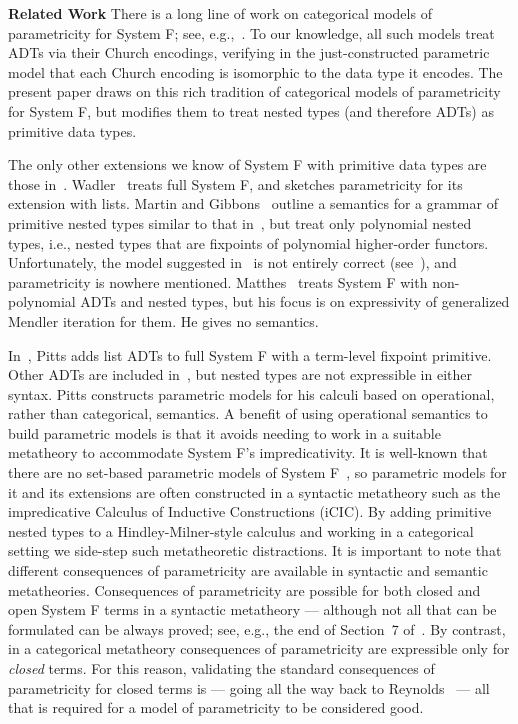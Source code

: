 \documentclass[runningheads]{llncs}
\begin{document}
\vspace*{0.05in}

\noindent
{\bf Related Work}\/ There is a long line of work on categorical
models of parametricity for System F; see,
e.g.,~\cite{bfss90,bm05,dr04,gjfor15,has94,jac99,mr92,rr94}.  To our
knowledge, all such models treat ADTs via their Church encodings,
verifying in the just-constructed parametric model that each Church
encoding is isomorphic to the data type it encodes.  The present paper
draws on this rich tradition of categorical models of parametricity
for System F, but modifies them to treat nested types (and therefore
ADTs) as primitive data types.

The only other extensions we know of System F with primitive data
types are those in~\cite{mat11,mg01,pit98,pit00,wad89}.
Wadler~\cite{wad89} treats full System F, and sketches parametricity
for its extension with lists. Martin and Gibbons~\cite{mg01} outline a
semantics for a grammar of primitive nested types similar to that
in~\cite{jp19}, but treat only polynomial nested types, i.e., nested
types that are fixpoints of polynomial higher-order
functors. Unfortunately, the model suggested in~\cite{mg01} is not
entirely correct (see~\cite{jp19}), and parametricity is nowhere
mentioned.  Matthes~\cite{mat11} treats System F with non-polynomial
ADTs and nested types, but his focus is on expressivity of generalized
Mendler iteration for them. He gives no semantics.

In~\cite{pit00}, Pitts adds list ADTs to full System F with a
term-level fixpoint primitive. Other ADTs are included
in~\cite{pit98}, but nested types are not expressible in either
syntax. Pitts constructs parametric models for his calculi based on
operational, rather than categorical, semantics. A benefit of using
operational semantics to build parametric models is that it avoids
needing to work in a suitable metatheory to accommodate System F's
impredicativity. It is well-known that there are no set-based
parametric models of System F~\cite{rey84}, so parametric models for
it and its extensions are often constructed in a syntactic metatheory
such as the impredicative Calculus of Inductive Constructions (iCIC).
By adding primitive nested types to a Hindley-Milner-style calculus
and working in a categorical setting we side-step such metatheoretic
distractions. It is important to note that different consequences of
parametricity are available in syntactic and semantic
metatheories. Consequences of parametricity are possible for both
closed and open System F terms in a syntactic metatheory --- although
not all that can be formulated can be always proved; see, e.g., the
end of Section~7 of~\cite{bm98}. By contrast, in a categorical
metatheory consequences of parametricity are expressible only for {\em
  closed} terms. For this reason, validating the standard consequences
of parametricity for closed terms is --- going all the way back to
Reynolds~\cite{rey83} --- all that is required for a model of
parametricity to be considered good.
\end{document}
